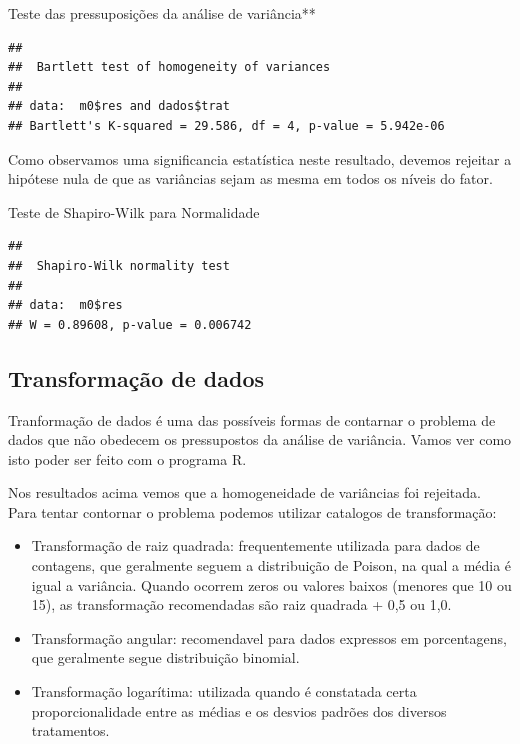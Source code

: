 \documentclass[
]{book}
\newenvironment{Shaded}{\begin{snugshade}}{\end{snugshade}}
\newcommand{\CommentTok}[1]{\textcolor[rgb]{0.56,0.35,0.01}{\textit{#1}}}
\newcommand{\KeywordTok}[1]{\textcolor[rgb]{0.13,0.29,0.53}{\textbf{#1}}}
\newcommand{\NormalTok}[1]{#1}
\newcommand{\OperatorTok}[1]{\textcolor[rgb]{0.81,0.36,0.00}{\textbf{#1}}}
\begin{document}
Teste das pressuposições da análise de variância**

\begin{Shaded}
\end{Shaded}

\begin{verbatim}
## 
##  Bartlett test of homogeneity of variances
## 
## data:  m0$res and dados$trat
## Bartlett's K-squared = 29.586, df = 4, p-value = 5.942e-06
\end{verbatim}

Como observamos uma significancia estatística neste resultado, devemos rejeitar a hipótese nula de que as variâncias sejam as mesma em todos os níveis do fator.

Teste de Shapiro-Wilk para Normalidade

\begin{Shaded}
\end{Shaded}

\begin{verbatim}
## 
##  Shapiro-Wilk normality test
## 
## data:  m0$res
## W = 0.89608, p-value = 0.006742
\end{verbatim}

\hypertarget{transformauxe7uxe3o-de-dados}{%
\subsection{Transformação de dados}\label{transformauxe7uxe3o-de-dados}}

Tranformação de dados é uma das possíveis formas de contarnar o problema de dados que não obedecem os pressupostos da análise de variância. Vamos ver como isto poder ser feito com o programa R.

Nos resultados acima vemos que a homogeneidade de variâncias foi rejeitada. Para tentar contornar o problema podemos utilizar catalogos de transformação:

\begin{itemize}
\item
  Transformação de raiz quadrada: frequentemente utilizada para dados de contagens, que geralmente seguem a distribuição de Poison, na qual a média é igual a variância. Quando ocorrem zeros ou valores baixos (menores que 10 ou 15), as transformação recomendadas são raiz quadrada + 0,5 ou 1,0.
\item
  Transformação angular: recomendavel para dados expressos em porcentagens, que geralmente segue distribuição binomial.
\item
  Transformação logarítima: utilizada quando é constatada certa proporcionalidade entre as médias e os desvios padrões dos diversos tratamentos.
\end{itemize}
\end{document}

